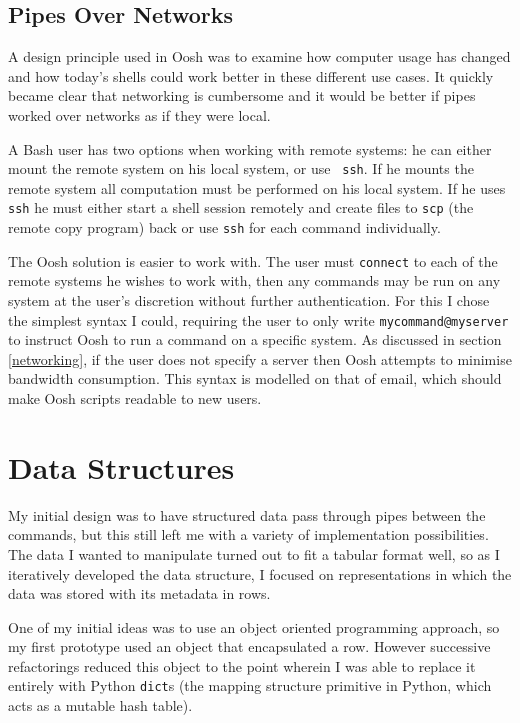 \documentclass[12pt,twoside,notitlepage]{report}
\begin{document}
\subsection{Pipes Over Networks}

A design principle used in Oosh was to examine how computer usage has
changed and how today's shells could work better in these different
use cases. It quickly became clear that networking is cumbersome and
it would be better if pipes worked over networks as if they were
local.

A Bash user has two options when working with remote systems: he can
either mount the remote system on his local system, or use {\tt
  ssh}. If he mounts the remote system all computation must be
performed on his local system. If he uses {\tt ssh} he must either
start a shell session remotely and create files to {\tt scp} (the
remote copy program) back or use {\tt ssh} for each command
individually.

The Oosh solution is easier to work with. The user must {\tt connect}
to each of the remote systems he wishes to work with, then any
commands may be run on any system at the user's discretion without
further authentication. For this I chose the simplest syntax I could,
requiring the user to only write {\tt mycommand@myserver} to instruct
Oosh to run a command on a specific system. As discussed in section
\ref{networking}, if the user does not specify a server then Oosh
attempts to minimise bandwidth consumption. This syntax is modelled on
that of email, which should make Oosh scripts readable to new users.

\section{Data Structures}
My initial design was to have structured data pass through pipes between the
commands, but this still left me with a variety of implementation
possibilities. The data I wanted to manipulate turned out to fit a tabular
format well, so as I iteratively developed the data structure, I
focused on representations in which the data was stored with its metadata
in rows.

One of my initial ideas was to use an object oriented programming
approach, so my first prototype used an object that encapsulated
a row. However successive refactorings reduced this object to the point
wherein I was able to replace it entirely with Python {\tt dict}s (the mapping
structure primitive in Python, which acts as a mutable hash table).
\end{document}
